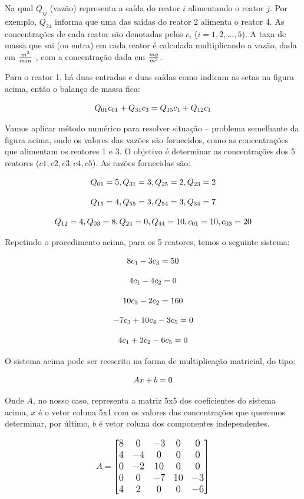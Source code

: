 Na qual $Q_{ij}$ (vazão) representa a saída do reator $i$ alimentando o reator $j$. Por exemplo, $Q_{24}$ informa que uma das saídas do reator 2 alimenta o reator 4. As concentrações de cada reator são denotadas pelos $c_{i}$ ($i = 1, 2, ..., 5$). A taxa de massa que sai (ou entra) em cada reator é calculada multiplicando a vazão, dada em  $\large \frac{m^3}{min}$ , com a concentração dada em $\large \frac{mg}{m^3}$. 

Para o reator 1, há duas entradas e duas saídas como indicam as setas na figura acima, então o balanço de massa fica:

$$\large Q_{01} c_{01}  + Q_{31} c_{3}  = Q_{15} c_{1}+ Q_{12} c_{1}$$

Vamos aplicar método numérico para resolver situação – problema semelhante da figura acima, onde os valores das vazões são fornecidos, como as concentrações que alimentam os reatores 1 e 3. O objetivo é determinar as concentrações dos 5 reatores ($c1, c2, c3, c4, c5$). 
As razões fornecidas são: 

$$
\large Q_{01} = 5, Q_{31} = 3, Q_{25} = 2, Q_{23} = 2
$$

$$
\large Q_{15} = 4, Q_{55} = 3, Q_{54} = 3, Q_{34} = 7
$$

$$
\large Q_{12} = 4, Q_{03} = 8, Q_{24} = 0, Q_{44} = 10, c_{01} = 10, c_{03} = 20
$$

Repetindo o procedimento acima, para os 5 reatores, temos o seguinte sistema:

$$\large 8c_{1}  - 3c_{3}  = 50$$

$$\large 4c_{1}  - 4c_{2}  = 0$$

$$\large 10c_{3}  - 2c_{2}  = 160$$

$$\large -7c_{3} + 10c_{4} - 3c_{5}  = 0$$

$$\large 4c_{1}  +2c_{2}  -6c_{5}  = 0$$

O sistema acima pode ser reescrito na forma de multiplicação matricial, do tipo:

$$\large Ax + b = 0$$

Onde $A$, no nosso caso, representa a matriz 5x5 dos coeficientes do sistema
acima, $x$ é o vetor coluna 5x1 com os valores das concentrações que queremos determinar, por último, $b$ é vetor coluna dos componentes independentes.

$$\large A = \begin{bmatrix} 8 & 0 & -3 & 0 & 0 \\ 4 & -4 & 0 & 0 & 0 \\ 0 & -2 & 10 & 0 & 0 \\ 0 & 0 & -7 & 10 & -3 \\ 4 & 2 & 0 & 0 & -6 \end{bmatrix}$$


